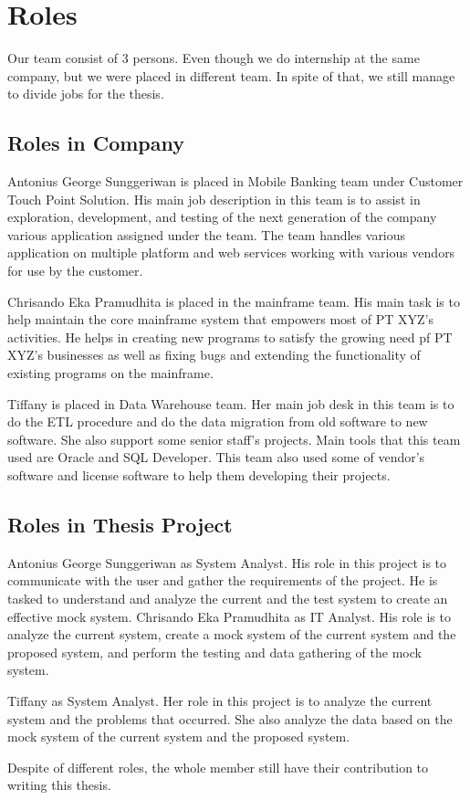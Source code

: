 \section{Roles}%
Our team consist of 3 persons. Even though we do internship at the same company, but we were placed in different team. In spite of that, we still manage to divide jobs for the thesis.

\subsection{Roles in Company}
Antonius George Sunggeriwan is placed in Mobile Banking team under Customer Touch Point Solution. His main job description in this team is to assist in exploration, development, and testing of the next generation of the company various application assigned under the team. The team handles various application on multiple platform and web services working with various vendors for use by the customer.

Chrisando Eka Pramudhita is placed in the mainframe team. His main task is to help maintain the core mainframe system that empowers most of PT XYZ’s activities.  He helps in creating new programs to satisfy the growing need pf PT XYZ’s businesses as well as fixing bugs and extending the functionality of existing programs on the mainframe.

Tiffany is placed in Data Warehouse team. Her main job desk in this team is to do the ETL procedure and do the data migration from old software to new software. She also support some senior staff's projects. Main tools that this team used are Oracle and SQL Developer. This team also used some of vendor's software and license software to help them developing their projects.

\subsection{Roles in Thesis Project}
Antonius George Sunggeriwan as System Analyst.
His role in this project is to communicate with the user and gather the requirements of the project. He is tasked to understand and analyze the current and the test system to create an effective mock system.
Chrisando Eka Pramudhita as IT Analyst.
His role is to analyze the current system, create a mock system of the current system and the proposed system, and perform the testing and data gathering of the mock system.

Tiffany as System Analyst.
Her role in this project is to analyze the current system and the problems that occurred. She also analyze the data based on the mock system of the current system  and the proposed system.

Despite of different roles, the whole member still have their contribution to writing this thesis.
